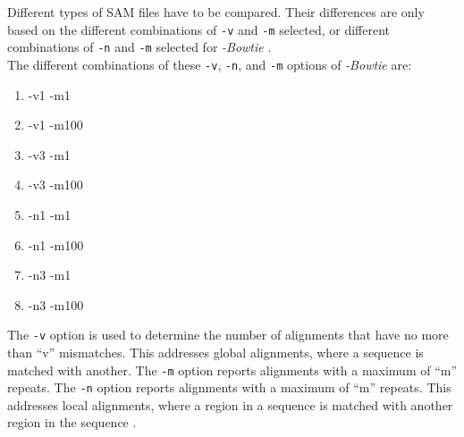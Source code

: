 \documentclass[letter,12pt]{article}
\begin{document}
Different types of SAM files have to be compared. Their differences are only based on the different combinations of {\tt -v} and {\tt -m} selected, or different combinations of {\tt -n} and {\tt -m} selected for {\it -Bowtie} \cite{Langmead2014}. \\

The different combinations of these {\tt -v}, {\tt -n}, and {\tt -m} options of {\it -Bowtie} are: \vspace{-0.3cm}
\begin{enumerate} \itemsep -4pt
\item -v1 -m1
\item -v1 -m100
\item -v3 -m1
\item -v3 -m100
\item -n1 -m1
\item -n1 -m100
\item -n3 -m1
\item -n3 -m100
\end{enumerate}

The {\tt -v} option is used to determine the number of alignments that have no more than ``v'' mismatches. This addresses global alignments, where a sequence is matched with another. The {\tt -m} option reports alignments with a maximum of ``m'' repeats. The {\tt -n} option reports alignments with a maximum of ``m'' repeats. This addresses local alignments, where a region in a sequence is matched with another region in the sequence \cite{Aramayo2014}.

\end{document}
